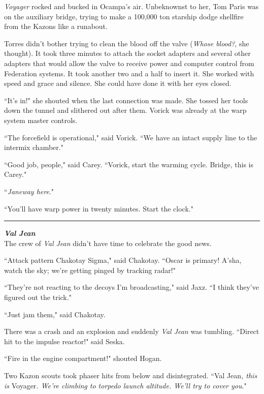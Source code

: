 \documentclass[twoside,letterpaper,12pt]{memoir}
\begin{document}
\textit{Voyager} rocked and bucked in Ocampa's air. Unbeknownst to her, Tom Paris was on the auxiliary bridge, trying to make a 100,000 ton starship dodge shellfire from the Kazons like a runabout.

Torres didn't bother trying to clean the blood off the valve (\textit{Whose blood?}, she thought). It took three minutes to attach the socket adapters and several other adapters that would allow the valve to receive power and computer control from Federation systems. It took another two and a half to insert it. She worked with speed and grace and silence. She could have done it with her eyes closed.

``It's in!" she shouted when the last connection was made. She tossed her tools down the tunnel and slithered out after them. Vorick was already at the warp system master controls.

``The forcefield is operational," said Vorick. ``We have an intact supply line to the intermix chamber."

``Good job, people," said Carey. ``Vorick, start the warming cycle. Bridge, this is Carey."

``\textit{Janeway here}."

``You'll have warp power in twenty minutes. Start the clock."

\begin{center}\rule{3cm}{0.4 pt}\end{center}

\noindent\textit{\textbf{Val Jean}}\\

The crew of \textit{Val Jean} didn't have time to celebrate the good news.

``Attack pattern Chakotay Sigma," said Chakotay. ``Oscar is primary! A'sha, watch the sky; we're getting pinged by tracking radar!"

``They're not reacting to the decoys I'm broadcasting," said Jaxz. ``I think they've figured out the trick."

``Just jam them," said Chakotay.

There was a crash and an explosion and suddenly \textit{Val Jean} was tumbling. ``Direct hit to the impulse reactor!" said Seska.

``Fire in the engine compartment!" shouted Hogan.

Two Kazon scouts took phaser hits from below and disintegrated. ``Val Jean\textit{, this is }Voyager\textit{. We're climbing to torpedo launch altitude. We'll try to cover you}."
\end{document}
